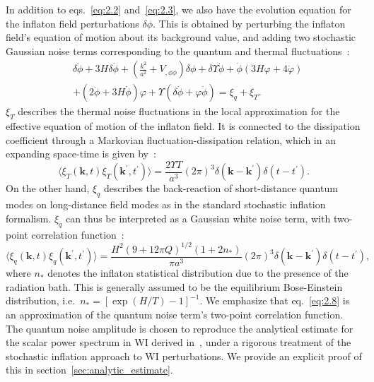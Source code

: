\documentclass[a4paper,11pt]{article}
\begin{document}
In addition to eqs.~\eqref{eq:2.2} and~\eqref{eq:2.3}, we also have the evolution equation for the inflaton field perturbations $\delta\phi$. This is obtained by perturbing the inflaton field's equation of motion about its background value, and adding two stochastic Gaussian noise terms corresponding to the quantum and thermal fluctuations~\cite{Ramos:2013nsa}:
\begin{align}
& \delta \ddot{\phi}+3 H \delta \dot{\phi}+\left(\frac{k^2}{a^2}+V_{, \phi \phi}\right) \delta \phi+\delta \Upsilon \dot{\phi} +\dot{\phi}(3H\varphi+4\dot{\varphi}) \nonumber\\
&+(2 \ddot{\phi}+3 H \dot{\phi}) \varphi+\Upsilon(\delta \dot{\phi}+\varphi\dot{\phi})=\xi_q+\xi_T. \label{eq:2.6}
\end{align}
$\xi_T$ describes the thermal noise fluctuations in the local approximation for the effective equation of motion of the inflaton field. It is connected to the dissipation coefficient through a Markovian fluctuation-dissipation
relation, which in an expanding space-time is
given by~\cite{Ramos:2013nsa}:
\begin{equation}
    \langle \xi_{T}(\mathbf{k},t)\xi_{T}(\mathbf{k^\prime},t^\prime)\rangle=\frac{2\Upsilon T}{a^3} (2\pi)^3 \delta(\mathbf{k}-\mathbf{k}^\prime) \delta(t-t^\prime). \label{eq:2.7}
\end{equation}
On the other hand, $\xi_q$ describes the back-reaction of short-distance quantum modes on long-distance field modes as in the standard stochastic inflation formalism. $\xi_q$ can thus be interpreted as a Gaussian white noise term, with two-point correlation function~\cite{Kamali:2023lzq}:
\begin{equation}
    \langle \xi_{q}(\mathbf{k},t)\xi_{q}(\mathbf{k^\prime},t^\prime)\rangle=\frac{H^2 (9+12\pi Q)^{1/2}(1+2n_{*})}{\pi a^3} (2\pi)^3 \delta(\mathbf{k}-\mathbf{k}^\prime) \delta(t-t^\prime),  \label{eq:2.8}
\end{equation}
where $n_*$ denotes the inflaton statistical distribution due to the presence of the radiation bath. This is generally assumed to be the equilibrium Bose-Einstein distribution, i.e.\ $n_* = [\exp(H/T) - 1]^{-1}$. We emphasize that eq.~\eqref{eq:2.8} is an approximation of the quantum noise term's two-point correlation function. The quantum noise amplitude is chosen to reproduce the analytical estimate for the scalar power spectrum in WI derived in~\cite{Ramos:2013nsa}, under a rigorous treatment of the stochastic inflation approach to WI perturbations. We provide an explicit proof of this in section~\ref{sec:analytic_estimate}.
\end{document}

